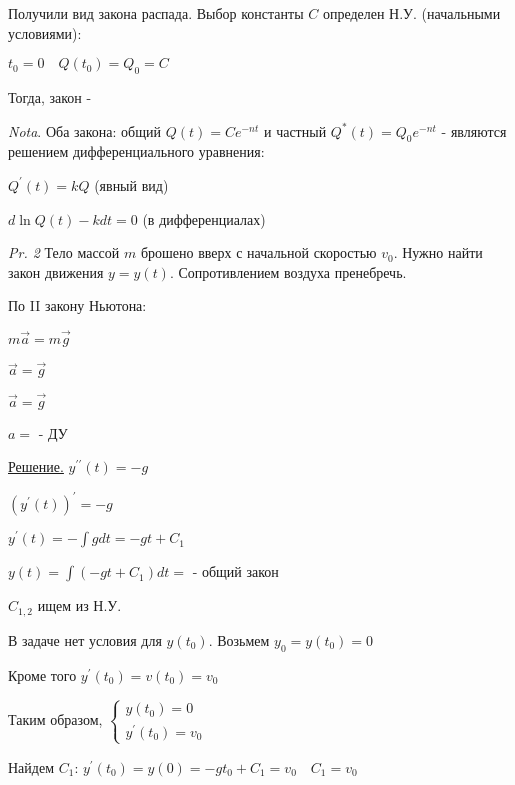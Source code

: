 \documentclass[12pt]{article}
\begin{document}
    Получили вид закона распада. Выбор константы $C$ определен Н.У. (начальными условиями):

    $\displaystyle t_0 = 0 \quad Q(t_0) = Q_0 = C$

    Тогда, закон - 

    \vspace{3mm}
\textit{Nota}. Оба закона: общий $\displaystyle Q(t) = Ce^{-nt}$ и частный $\displaystyle Q^*(t) = Q_0 e^{-nt}$ -
    являются решением дифференциального уравнения:

    $\displaystyle Q^\prime(t) = kQ$  (явный вид)

    $d \ln Q(t) - kdt = 0$ (в дифференциалах)

    \vspace{5mm}

    \textit{Pr. 2} \quad Тело массой $m$ брошено вверх с начальной скоростью $\displaystyle v_0$. Нужно найти закон движения $y = y(t)$.
    Сопротивлением воздуха пренебречь.

    По II закону Ньютона:

    $m\overrightarrow{a} = m\overrightarrow{g}$

    $\overrightarrow{a} = \overrightarrow{g}$

    $\overrightarrow{a} = \overrightarrow{g}$

    $a = $ - ДУ

    \underline{Решение.} \quad $\displaystyle y^{\prime\prime}(t) = -g$

    $\displaystyle (y^{\prime}(t))^\prime = -g$

    $\displaystyle y^{\prime}(t) = -\int g dt = -gt + C_1$

    $\displaystyle y(t) = \int (-gt + C_1) dt = $ - общий закон

    $\displaystyle C_{1,2}$ ищем из Н.У.

    В задаче нет условия для $\displaystyle y(t_0)$. Возьмем $\displaystyle y_0 = y(t_0) = 0$

    Кроме того $\displaystyle y^\prime(t_0) = v(t_0) = v_0$

    Таким образом, $\displaystyle \begin{cases}y(t_0) = 0 \\ y^\prime(t_0) = v_0\end{cases}$

    Найдем $\displaystyle C_1$: $\displaystyle y^\prime(t_0) = y(0) = -gt_0 + C_1 = v_0 \quad C_1 = v_0$
\end{document}
